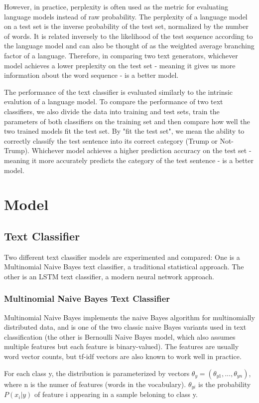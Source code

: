 \documentclass{article}
\begin{document}
However, in practice, perplexity is often used as the metric for evaluating language models instead of raw probability. The perplexity of a language model on a test set is the inverse probability of the test set, normalized by the number of words. It is related inversely to the likelihood of the test sequence according to the language model and can also be thought of as the weighted average branching factor of a language. Therefore, in comparing two text generators, whichever model achieves a lower preplexity on the test set - meaning it gives us more information about the word sequence - is a better model.

The performance of the text classifier is evaluated similarly to the intrinsic evalution of a language model. To compare the performance of two text classifiers, we also divide the data into training and test sets, train the parameters of both classifiers on the training set and then compare how well the two trained models fit the test set. By "fit the test set", we mean the ability to correctly classify the test sentence into its correct category (Trump or Not-Trump). Whichever model achieves a higher prediction accuracy on the test set - meaning it more accurately predicts the category of the test sentence - is a better model.

\section{Model}
\subsection{Text Classifier}
Two different text classifier models are experimented and compared: One is a Multinomial Naive Bayes text classifier, a traditional statistical approach. The other is an LSTM text classifier, a modern neural network approach.
\subsubsection{Multinomial Naive Bayes Text Classifier}
Multinomial Naive Bayes implements the naive Bayes algorithm for multinomially distributed data, and is one of the two classic naive Bayes variants used in text classification (the other is Bernoulli Naive Bayes model, which also assumes multiple features but each feature is binary-valued). The features are usually word vector counts, but tf-idf vectors are also known to work well in practice.

For each class y, the distribution is parameterized by vectors $\theta_y = (\theta_{y1}, ..., \theta_{yn})$, where n is the numer of features (words in the vocabulary). $\theta_{yi}$ is the probability $P(x_i | y)$ of feature i appearing in a sample beloning to class y.
\end{document}

